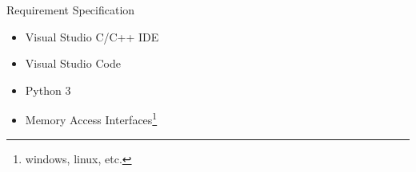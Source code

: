 \begin{frame}{Requirement Specification}
    \begin{itemize}
        \item Visual Studio C/C++ IDE
        \item Visual Studio Code
        \item Python 3
        \item Memory Access Interfaces\footnote{windows, linux, etc.}
    \end{itemize}
\end{frame}